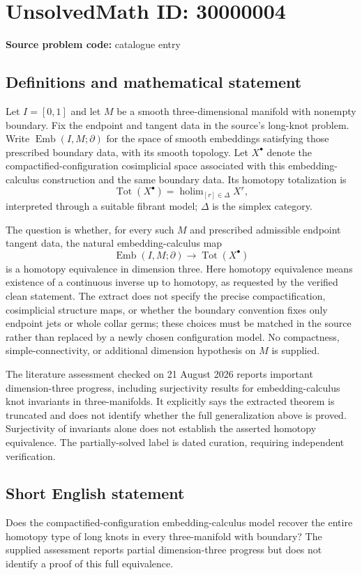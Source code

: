 \documentclass[11pt]{article}
\begin{document}
\section*{UnsolvedMath ID: 30000004}
\textbf{Source problem code:} catalogue entry
\subsection{Definitions and mathematical statement}
Let $I=[0,1]$ and let $M$ be a smooth three-dimensional manifold with nonempty boundary. Fix the endpoint and tangent data in the source's long-knot problem. Write $\operatorname{Emb}(I,M;\partial)$ for the space of smooth embeddings satisfying those prescribed boundary data, with its smooth topology. Let $X^\bullet$ denote the compactified-configuration cosimplicial space associated with this embedding-calculus construction and the same boundary data. Its homotopy totalization is
\[
 \operatorname{Tot}(X^\bullet)=\operatorname{holim}_{[r]\in\Delta}X^r,
\]
interpreted through a suitable fibrant model; $\Delta$ is the simplex category.

The question is whether, for every such $M$ and prescribed admissible endpoint tangent data, the natural embedding-calculus map
\[
 \operatorname{Emb}(I,M;\partial)\longrightarrow\operatorname{Tot}(X^\bullet)
\]
is a homotopy equivalence in dimension three. Here homotopy equivalence means existence of a continuous inverse up to homotopy, as requested by the verified clean statement. The extract does not specify the precise compactification, cosimplicial structure maps, or whether the boundary convention fixes only endpoint jets or whole collar germs; these choices must be matched in the source rather than replaced by a newly chosen configuration model. No compactness, simple-connectivity, or additional dimension hypothesis on $M$ is supplied.

The literature assessment checked on 21 August 2026 reports important dimension-three progress, including surjectivity results for embedding-calculus knot invariants in three-manifolds. It explicitly says the extracted theorem is truncated and does not identify whether the full generalization above is proved. Surjectivity of invariants alone does not establish the asserted homotopy equivalence. The partially-solved label is dated curation, requiring independent verification.
\subsection{Short English statement}
Does the compactified-configuration embedding-calculus model recover the entire homotopy type of long knots in every three-manifold with boundary? The supplied assessment reports partial dimension-three progress but does not identify a proof of this full equivalence.
\end{document}
